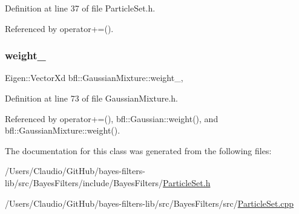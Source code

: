 Definition at line 37 of file Particle\+Set.\+h.



Referenced by operator+=().

\mbox{\label{classbfl_1_1GaussianMixture_ac9ce000575d6b29ad8e1a756d750faff}} 
\subsubsection{\texorpdfstring{weight\+\_\+}{weight\_}}
{\footnotesize\ttfamily Eigen\+::\+Vector\+Xd bfl\+::\+Gaussian\+Mixture\+::weight\+\_\+\hspace{0.3cm}{\ttfamily [protected]}, {\ttfamily [inherited]}}



Definition at line 73 of file Gaussian\+Mixture.\+h.



Referenced by operator+=(), bfl\+::\+Gaussian\+::weight(), and bfl\+::\+Gaussian\+Mixture\+::weight().



The documentation for this class was generated from the following files\+:\begin{DoxyCompactItemize}
\item 
/\+Users/\+Claudio/\+Git\+Hub/bayes-\/filters-\/lib/src/\+Bayes\+Filters/include/\+Bayes\+Filters/\mbox{\hyperlink{ParticleSet_8h}{Particle\+Set.\+h}}\item 
/\+Users/\+Claudio/\+Git\+Hub/bayes-\/filters-\/lib/src/\+Bayes\+Filters/src/\mbox{\hyperlink{ParticleSet_8cpp}{Particle\+Set.\+cpp}}\end{DoxyCompactItemize}
